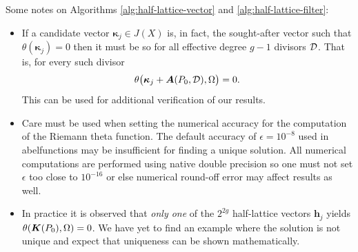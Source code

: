 Some notes on Algorithms \ref{alg:half-lattice-vector} and
\ref{alg:half-lattice-filter}:
\begin{itemize}
\item If a candidate vector $\boldsymbol{\kappa}_j \in J(X)$ is, in fact, the
  sought-after vector such that $\theta(\boldsymbol{\kappa}_j) = 0$ then it must
  be so for all effective degree $g-1$ divisors $\operatorname{\mathcal{D}}$. That is, for every such
  divisor
  \begin{equation}
    \theta\big(\boldsymbol{\kappa}_j + \operatorname{\boldsymbol{A}}(P_0,\operatorname{\mathcal{D}}), \Omega \big) = 0.
  \end{equation}
  This can be used for additional verification of our results.
\item Care must be used when setting the numerical accuracy for the computation
  of the Riemann theta function. The default accuracy of $\epsilon = 10^{-8}$
  used in {\sc abelfunctions} may be insufficient for finding a unique solution.
  All numerical computations are performed using native double precision so one
  must not set $\epsilon$ too close to $10^{-16}$ or else numerical round-off
  error may affect results as well.
\item In practice it is observed that {\it only one} of the $2^{2g}$
  half-lattice vectors $\boldsymbol{h}_j$ yields $\theta(\operatorname{\boldsymbol{K}}(P_0),\Omega) = 0$.
  We have yet to find an example where the solution is not unique and expect
  that uniqueness can be shown mathematically.
\end{itemize}
